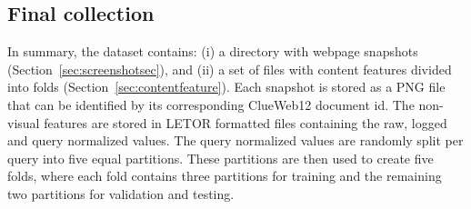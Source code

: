 \subsection{Final collection}\label{sec:finalcollection}
In summary, the \datasetname{} dataset contains:
(i) a directory with webpage snapshots (Section~\ref{sec:screenshotsec}), and
(ii) a set of files with content features divided into folds (Section~\ref{sec:contentfeature}).
Each snapshot is stored as a PNG file that can be identified by its corresponding ClueWeb12 document id. 
The non-visual features are stored in LETOR formatted files containing the raw, logged and query normalized values.
The query normalized values are randomly split per query into five equal partitions.
These partitions are then used to create five folds, where each fold contains three partitions for training and the remaining two partitions for validation and testing.



